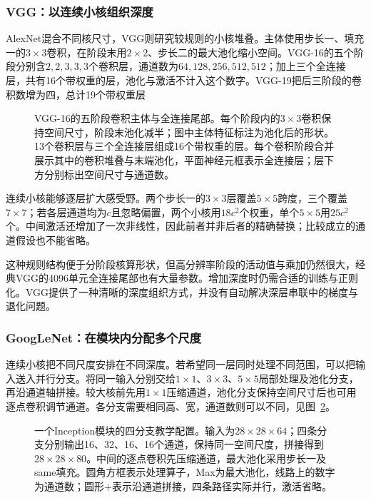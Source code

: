 \FloatBarrier

\subsubsection{VGG：以连续小核组织深度}
\label{sec:cnn-vgg}

AlexNet混合不同核尺寸，VGG则研究较规则的小核堆叠。主体使用步长一、填充一的$3\times3$卷积，在阶段末用$2\times2$、步长二的最大池化缩小空间。VGG-16的五个阶段分别含$2,2,3,3,3$个卷积层，通道数为$64,128,256,512,512$；加上三个全连接层，共有16个带权重的层，池化与激活不计入这个数字。VGG-19把后三阶段的卷积数增为四，总计19个带权重层

\begin{figure}[tbp]
  \centering
  
  \caption{VGG-16的五阶段卷积主体与全连接尾部。每个阶段内的$3\times3$卷积保持空间尺寸，阶段末池化减半；图中主体特征标注为池化后的形状。13个卷积层与三个全连接层组成16个带权重的层。每个卷积阶段合并展示其中的卷积堆叠与末端池化，平面神经元框表示全连接层；层下方分别标出空间尺寸与通道数。}
  \label{fig:cnn-vgg}
\end{figure}

连续小核能够逐层扩大感受野。两个步长一的$3\times3$层覆盖$5\times5$跨度，三个覆盖$7\times7$；若各层通道均为$c$且忽略偏置，两个小核用$18c^2$个权重，单个$5\times5$用$25c^2$个。中间激活还增加了一次非线性，因此前者并非后者的精确替换；比较成立的通道假设也不能省略。

这种规则结构便于分阶段核算形状，但高分辨率阶段的活动值与乘加仍然很大，经典VGG的4096单元全连接尾部也有大量参数。增加深度时仍需合适的训练与正则化。VGG提供了一种清晰的深度组织方式，并没有自动解决深层串联中的梯度与退化问题。

\FloatBarrier

\subsubsection{GoogLeNet：在模块内分配多个尺度}
\label{sec:cnn-googlenet}

连续小核把不同尺度安排在不同深度。若希望同一层同时处理不同范围，可以把输入送入并行分支。将同一输入分别交给$1\times1$、$3\times3$、$5\times5$局部处理及池化分支，再沿通道轴拼接。较大核前先用$1\times1$压缩通道，池化分支保持空间尺寸后也可用逐点卷积调节通道。各分支需要相同高、宽，通道数则可以不同，见图~\ref{fig:cnn-inception}。

\begin{figure}[tb]
  \centering
  
  \caption{一个Inception模块的四分支教学配置。输入为$28\times28\times64$；四条分支分别输出16、32、16、16个通道，保持同一空间尺度，拼接得到$28\times28\times80$。中间的逐点卷积先压缩通道，最大池化采用步长一及same填充。圆角方框表示处理算子，Max为最大池化，线路上的数字为通道数；圆形$+$表示沿通道拼接，四条路径实际并行，激活省略。}
  \label{fig:cnn-inception}
\end{figure}

